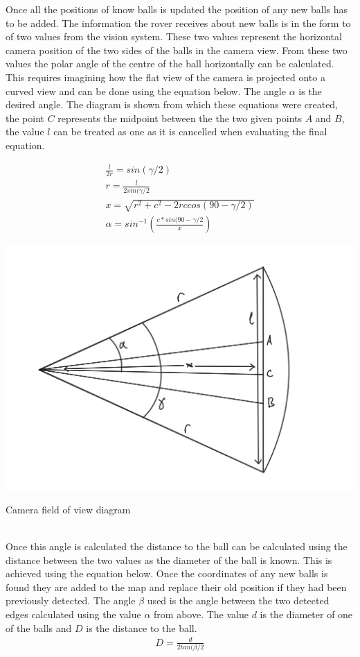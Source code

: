 \documentclass[10pt,twoside]{article}
\begin{document}
Once all the positions of know balls is updated the position of any new balls has to be added. The information the rover receives about new balls is in the form to of two values from the vision system. These two values represent the horizontal camera position of the two sides of the balls in the camera view. From these two values the polar angle of the centre of the ball horizontally can be calculated. This requires imagining how the flat view of the camera is projected onto a curved view and can be done using the equation below. The angle $\alpha$ is the desired angle. The diagram is shown from which these equations were created, the point $C$ represents the midpoint between the the two given points $A$ and $B$, the value $l$ can be treated as one as it is cancelled when evaluating the final equation.
\begin{minipage}{.5\textwidth}
\begin{gather}
\frac{l}{2r}=sin(\gamma/2) \\
r = \frac{l}{2sin(\gamma/2} \\
x = \sqrt{r^2 + c^2 - 2rccos(90-\gamma/2)} \\
\alpha = sin^{-1}(\frac{c*sin(90-\gamma/2}{x})
\end{gather}
\end{minipage}
\begin{minipage}{.5\textwidth}
    \centering
    \includegraphics[scale = 0.6]{CommandFOV.png}
    \caption{Camera field of view diagram}
    \label{fig:CommandFOV}
\end{minipage}
\\
Once this angle is calculated the distance to the ball can be calculated using the distance between the two values as the diameter of the ball is known. This is achieved using the equation below. Once the coordinates of any new balls is found they are added to the map and replace their old position if they had been previously detected. The angle $\beta$ used is the angle between the two detected edges calculated using the value $\alpha$ from above. The value $d$ is the diameter of one of the balls and $D$ is the distance to the ball.
\begin{gather}
D = \frac{d}{2tan(\beta/2}
\end{gather}
\end{document}
